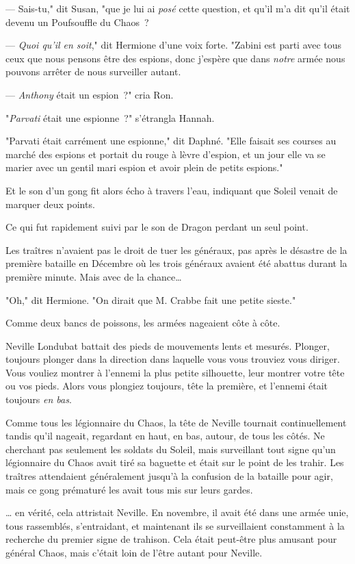 --- Sais-tu," dit Susan, "que je lui ai \emph{posé} cette question, et qu'il m'a dit qu'il était devenu un Poufsouffle du Chaos~?

--- \emph{Quoi qu'il en soit}," dit Hermione d'une voix forte. "Zabini est parti avec tous ceux que nous pensons être des espions, donc j'espère que dans \emph{notre} armée nous pouvons arrêter de nous surveiller autant.

--- \emph{Anthony} était un espion~?" cria Ron.

"\emph{Parvati} était une espionne~?" s'étrangla Hannah.

"Parvati était carrément une espionne," dit Daphné. "Elle faisait ses courses au marché des espions et portait du rouge à lèvre d'espion, et un jour elle va se marier avec un gentil mari espion et avoir plein de petits espions."

Et le son d'un gong fit alors écho à travers l'eau, indiquant que Soleil venait de marquer deux points.

Ce qui fut rapidement suivi par le son de Dragon perdant un seul point.

Les traîtres n'avaient pas le droit de tuer les généraux, pas après le désastre de la première bataille en Décembre où les trois généraux avaient été abattus durant la première minute. Mais avec de la chance…

"Oh," dit Hermione. "On dirait que M. Crabbe fait une petite sieste."

\later

Comme deux bancs de poissons, les armées nageaient côte à côte.

Neville Londubat battait des pieds de mouvements lents et mesurés. Plonger, toujours plonger dans la direction dans laquelle vous vous trouviez vous diriger. Vous vouliez montrer à l'ennemi la plus petite silhouette, leur montrer votre tête ou vos pieds. Alors vous plongiez toujours, tête la première, et l'ennemi était toujours \emph{en bas}.

Comme tous les légionnaire du Chaos, la tête de Neville tournait continuellement tandis qu'il nageait, regardant en haut, en bas, autour, de tous les côtés. Ne cherchant pas seulement les soldats du Soleil, mais surveillant tout signe qu'un légionnaire du Chaos avait tiré sa baguette et était sur le point de les trahir. Les traîtres attendaient généralement jusqu'à la confusion de la bataille pour agir, mais ce gong prématuré les avait tous mis sur leurs gardes.

… en vérité, cela attristait Neville. En novembre, il avait été dans une armée unie, tous rassemblés, s'entraidant, et maintenant ils se surveillaient constamment à la recherche du premier signe de trahison. Cela était peut-être plus amusant pour général Chaos, mais c'était loin de l'être autant pour Neville.

